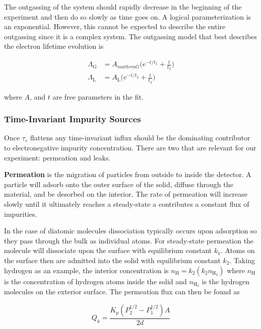 The outgassing of the system should rapidly decrease in the beginning of the experiment and then do so slowly as time goes on.  A
logical parameterization is an exponential.  However, this cannot be expected to describe the entire outgassing since it is a complex
system.  The outgassing model that best describes the electron lifetime evolution is

\begin{subequations}
\begin{align}
\Lambda_{\mathrm{G}} &= A_{mathrm{G}} \bigg( e^{-t/t_1} + \frac{t}{t_2} \bigg) \\
\Lambda_{\mathrm{L}} &= A_{\mathrm{L}} \bigg( e^{-t/t_3} + \frac{t}{t_4} \bigg)
\end{align}
\end{subequations}

\noindent where $A$, and $t$ are free parameters in the fit.



\subsubsection{Time-Invariant Impurity Sources}
\label{subsubsec:electron_lifetime_model_outgassing_leak_sources}
Once $\tau_e$ flattens any time-invariant influx should be the dominating contributor to electronegative impurity concentration.  There
are two that are relevant for our experiment: permeation and leaks.

\textbf{Permeation} is the migration of particles from outside to inside the detector.  A particle will adsorb onto the outer surface of
the solid, diffuse through the material, and be desorbed on the interior.  The rate of permeation will increase slowly until it ultimately
reaches a steady-state a contributes a constant flux of impurities.

In the case of diatomic molecules dissociation typically occurs
upon adsorption so they pass through the bulk as individual atoms.  For steady-state permeation the molecule will dissociate upon the
surface with equilibrium constant $k_1$.  Atoms on the surface then are admitted into the solid with equilibrium constant $k_2$.  Taking
hydrogen as an example, the
interior concentration is $n_{\mathrm{H}} = k_2 (k_2 n_{\mathrm{H_2}})$ where $n_{\mathrm{H}}$ is the concentration of hydrogen atoms
inside the solid and $n_{\mathrm{H_2}}$ is the hydrogen molecules on the exterior surface.  The permeation flux can then be found as

\begin{equation}
Q_k = \frac{K_p (P_2^{1/2} - P_1^{1/2})A}{2d}
\label{eq:electron_lifetime_model_outgassing_leak_sources_perm}
\end{equation}

